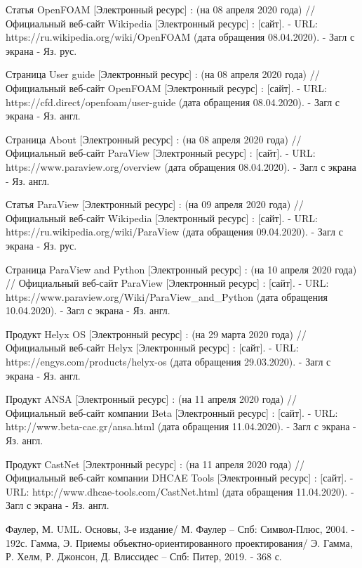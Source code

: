 \documentclass[14pt]{extreport}
\begin{document}
\begin{thebibliography}{9}

   Статья OpenFOAM [Электронный ресурс] : (на 08 апреля 2020 года) // Официальный веб-сайт Wikipedia [Электронный ресурс] : [сайт]. - URL: https://ru.wikipedia.org/wiki/OpenFOAM (дата обращения 08.04.2020). - Загл с экрана - Яз. рус.
   
   Страница User guide [Электронный ресурс] : (на 08 апреля 2020 года) // Официальный веб-сайт OpenFOAM [Электронный ресурс] : [сайт]. - URL: https://cfd.direct/openfoam/user-guide (дата обращения 08.04.2020). - Загл с экрана - Яз. англ.
   
   Страница About [Электронный ресурс] : (на 08 апреля 2020 года) // Официальный веб-сайт ParaView [Электронный ресурс] : [сайт]. - URL: https://www.paraview.org/overview (дата обращения 08.04.2020). - Загл с экрана - Яз. англ.
   
   Статья ParaView [Электронный ресурс] : (на 09 апреля 2020 года) // Официальный веб-сайт Wikipedia [Электронный ресурс] : [сайт]. - URL: https://ru.wikipedia.org/wiki/ParaView (дата обращения 09.04.2020). - Загл с экрана - Яз. рус.
   


   Страница ParaView and Python [Электронный ресурс] : (на 10 апреля 2020 года) // Официальный веб-сайт ParaView [Электронный ресурс] : [сайт]. - URL: https://www.paraview.org/Wiki/ParaView\_and\_Python (дата обращения 10.04.2020). - Загл с экрана - Яз. англ.
  
   Продукт Helyx OS [Электронный ресурс] : (на 29 марта 2020 года) // Официальный веб-сайт Helyx [Электронный ресурс] : [сайт]. - URL: https://engys.com/products/helyx-os (дата обращения 29.03.2020). - Загл с экрана - Яз. англ.
      
   Продукт ANSA [Электронный ресурс] : (на 11 апреля 2020 года) // Официальный веб-сайт компании Beta [Электронный ресурс] : [сайт]. - URL: http://www.beta-cae.gr/ansa.html (дата обращения 11.04.2020). - Загл с экрана - Яз. англ.
   
   Продукт CastNet [Электронный ресурс] : (на 11 апреля 2020 года) // Официальный веб-сайт компании DHCAE Tools [Электронный ресурс] : [сайт]. - URL: http://www.dhcae-tools.com/CastNet.html (дата обращения 11.04.2020). - Загл с экрана - Яз. англ.  

  Фаулер, М. UML. Основы, 3-е издание/ М. Фаулер -- Спб: Символ-Плюс, 2004. - 192с.
  Гамма, Э. Приемы объектно-ориентированного проектирования/ Э. Гамма, Р. Хелм, Р. Джонсон, Д. Влиссидес -- Спб: Питер, 2019. - 368 с.
  

\end{thebibliography}
\end{document}
